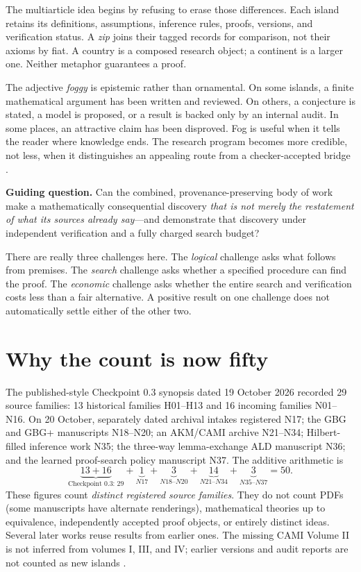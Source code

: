 \documentclass[11pt,letterpaper,oneside]{article}
\begin{document}
The multiarticle idea begins by refusing to erase those differences. Each island retains its definitions, assumptions, inference rules, proofs, versions, and verification status. A \emph{zip} joins their tagged records for comparison, not their axioms by fiat. A country is a composed research object; a continent is a larger one. Neither metaphor guarantees a proof.

The adjective \emph{foggy} is epistemic rather than ornamental. On some islands, a finite mathematical argument has been written and reviewed. On others, a conjecture is stated, a model is proposed, or a result is backed only by an internal audit. In some places, an attractive claim has been disproved. Fog is useful when it tells the reader where knowledge ends. The research program becomes more credible, not less, when it distinguishes an appealing route from a checker-accepted bridge \cite{checkpoint}.

\begin{insight}
\textbf{Guiding question.} Can the combined, provenance-preserving body of work make a mathematically consequential discovery \emph{that is not merely the restatement of what its sources already say}---and demonstrate that discovery under independent verification and a fully charged search budget?
\end{insight}

There are really three challenges here. The \emph{logical} challenge asks what follows from premises. The \emph{search} challenge asks whether a specified procedure can find the proof. The \emph{economic} challenge asks whether the entire search and verification costs less than a fair alternative. A positive result on one challenge does not automatically settle either of the other two.

\section{Why the count is now fifty}
The published-style Checkpoint 0.3 synopsis dated 19 October 2026 recorded 29 source families: 13 historical families H01--H13 and 16 incoming families N01--N16. On 20 October, separately dated archival intakes registered N17; the GBG and GBG+ manuscripts N18--N20; an AKM/CAMI archive N21--N34; Hilbert-filled inference work N35; the three-way lemma-exchange ALD manuscript N36; and the learned proof-search policy manuscript N37. The additive arithmetic is
\[
\underbrace{13+16}_{\text{Checkpoint 0.3: 29}}
+\underbrace{1}_{N17}+\underbrace{3}_{N18\text{--}N20}
+\underbrace{14}_{N21\text{--}N34}+\underbrace{3}_{N35\text{--}N37}
=\boxed{50}.
\]
These figures count \emph{distinct registered source families}. They do not count PDFs (some manuscripts have alternate renderings), mathematical theories up to equivalence, independently accepted proof objects, or entirely distinct ideas. Several later works reuse results from earlier ones. The missing CAMI Volume II is not inferred from volumes I, III, and IV; earlier versions and audit reports are not counted as new islands \cite{checkpoint,n17,gbg,akm,n35,n36,n37}.
\end{document}
